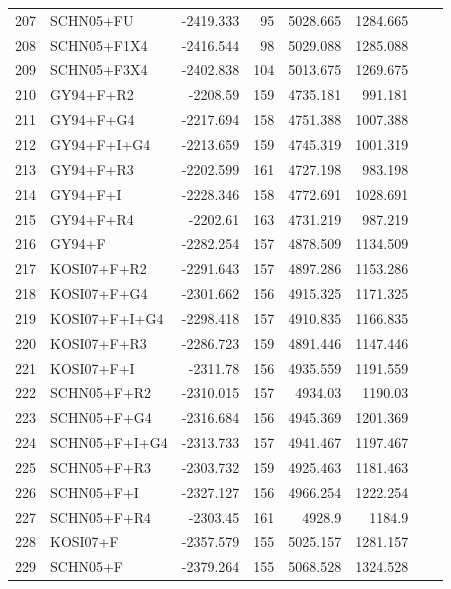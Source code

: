 \documentclass[fleqn,letterpaper]{article}
\begin{document}
\begin{longtable}{clrrrrrr}
	207 & SCHN05+FU & -2419.333 & 95 & 5028.665 & 1284.665 \\ 
	208 & SCHN05+F1X4 & -2416.544 & 98 & 5029.088 & 1285.088 \\ 
	209 & SCHN05+F3X4 & -2402.838 & 104 & 5013.675 & 1269.675 \\ 
	210 & GY94+F+R2 & -2208.59 & 159 & 4735.181 & 991.181 \\ 
	211 & GY94+F+G4 & -2217.694 & 158 & 4751.388 & 1007.388 \\ 
	212 & GY94+F+I+G4 & -2213.659 & 159 & 4745.319 & 1001.319 \\ 
	213 & GY94+F+R3 & -2202.599 & 161 & 4727.198 & 983.198 \\ 
	214 & GY94+F+I & -2228.346 & 158 & 4772.691 & 1028.691 \\ 
	215 & GY94+F+R4 & -2202.61 & 163 & 4731.219 & 987.219 \\ 
	216 & GY94+F & -2282.254 & 157 & 4878.509 & 1134.509 \\ 
	217 & KOSI07+F+R2 & -2291.643 & 157 & 4897.286 & 1153.286 \\ 
	218 & KOSI07+F+G4 & -2301.662 & 156 & 4915.325 & 1171.325 \\ 
	219 & KOSI07+F+I+G4 & -2298.418 & 157 & 4910.835 & 1166.835 \\ 
	220 & KOSI07+F+R3 & -2286.723 & 159 & 4891.446 & 1147.446 \\ 
	221 & KOSI07+F+I & -2311.78 & 156 & 4935.559 & 1191.559 \\ 
	222 & SCHN05+F+R2 & -2310.015 & 157 & 4934.03 & 1190.03 \\ 
	223 & SCHN05+F+G4 & -2316.684 & 156 & 4945.369 & 1201.369 \\ 
	224 & SCHN05+F+I+G4 & -2313.733 & 157 & 4941.467 & 1197.467 \\ 
	225 & SCHN05+F+R3 & -2303.732 & 159 & 4925.463 & 1181.463 \\ 
	226 & SCHN05+F+I & -2327.127 & 156 & 4966.254 & 1222.254 \\ 
	227 & SCHN05+F+R4 & -2303.45 & 161 & 4928.9 & 1184.9 \\ 
	228 & KOSI07+F & -2357.579 & 155 & 5025.157 & 1281.157 \\ 
	229 & SCHN05+F & -2379.264 & 155 & 5068.528 & 1324.528  \\
\end{longtable}

\clearpage
\end{document}

